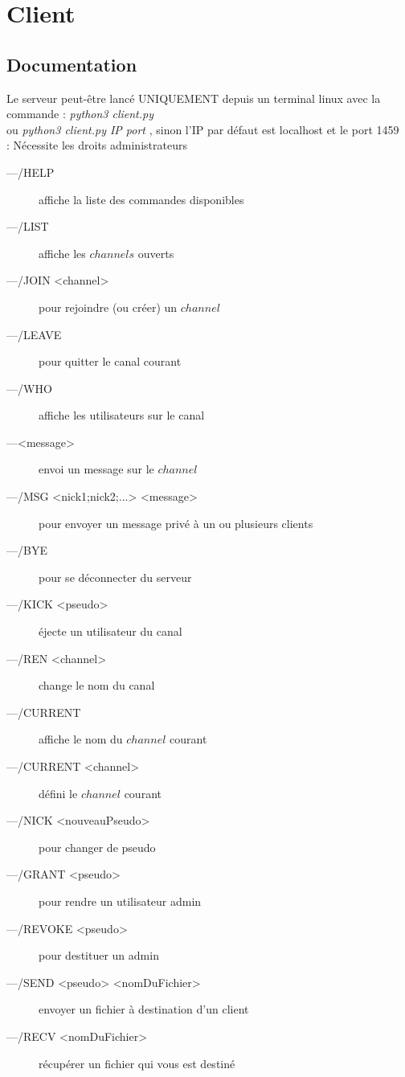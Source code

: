 \documentclass[12pt]{article}
\begin{document}
{\section{Client}

\subsection{Documentation}
Le serveur peut-être lancé UNIQUEMENT depuis un terminal linux avec
la commande : \emph{python3 client.py}
\\ou \emph{python3 client.py IP port} , sinon l'IP par défaut est localhost et le port 1459
\\ : Nécessite les droits administrateurs
\\
\begin{description}
    \item[---/HELP] affiche la liste des commandes disponibles
\item[---/LIST] affiche les $channels$ ouverts
\item[---/JOIN <channel>] pour rejoindre (ou créer) un $channel$
\item[---/LEAVE] pour quitter le canal courant
\item[---/WHO] affiche les utilisateurs sur le canal
\item[---<message>] envoi un message sur le $channel$
\item[---/MSG <nick1;nick2;...> <message>] pour envoyer un message privé à un ou plusieurs clients
\item[---/BYE] pour se déconnecter du serveur
\item[---/KICK <pseudo>] éjecte un utilisateur du canal
\item[---/REN <channel>] change le nom du canal
\item[---/CURRENT] affiche le nom du $channel$ courant
\item[---/CURRENT <channel>] défini le $channel$ courant
\item[---/NICK <nouveauPseudo>] pour changer de pseudo
\item[---/GRANT <pseudo>] pour rendre un utilisateur admin
\item[---/REVOKE <pseudo>] pour destituer un admin
\item[---/SEND <pseudo> <nomDuFichier>] envoyer un fichier à destination d'un client
\item[---/RECV <nomDuFichier>] récupérer un fichier qui vous est destiné
\end{description}



}
\end{document}
